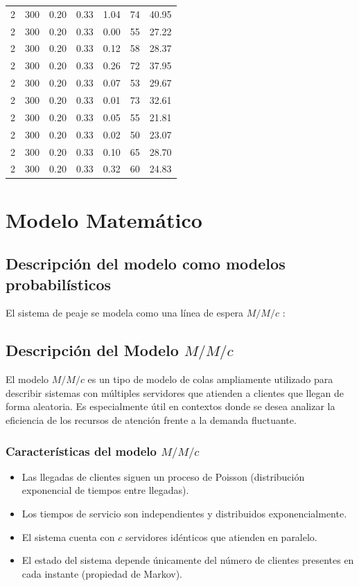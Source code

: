 \documentclass[12pt]{article}
\begin{document}
\begin{table}[H]
\begin{tabularx}{\textwidth}{|c|c|c|c|c|c|c|}
    2 & 300 & 0.20 & 0.33 & 1.04 & 74 & 40.95 \\
    2 & 300 & 0.20 & 0.33 & 0.00 & 55 & 27.22 \\
    2 & 300 & 0.20 & 0.33 & 0.12 & 58 & 28.37 \\
    2 & 300 & 0.20 & 0.33 & 0.26 & 72 & 37.95 \\
    2 & 300 & 0.20 & 0.33 & 0.07 & 53 & 29.67 \\
    2 & 300 & 0.20 & 0.33 & 0.01 & 73 & 32.61 \\
    2 & 300 & 0.20 & 0.33 & 0.05 & 55 & 21.81 \\
    2 & 300 & 0.20 & 0.33 & 0.02 & 50 & 23.07 \\
    2 & 300 & 0.20 & 0.33 & 0.10 & 65 & 28.70 \\
    2 & 300 & 0.20 & 0.33 & 0.32 & 60 & 24.83 \\
    \bottomrule
    \end{tabularx}
    
    \end{table}
    

    \newpage

    \section{Modelo Matemático}

    \subsection{Descripción del modelo como modelos probabilísticos}
    
    El sistema de peaje se modela como una línea de espera \( M/M/c \) :
    \subsection*{Descripción del Modelo $M/M/c$}

El modelo $M/M/c$ es un tipo de modelo de colas ampliamente utilizado para describir sistemas con múltiples servidores que atienden a clientes que llegan de forma aleatoria. Es especialmente útil en contextos donde se desea analizar la eficiencia de los recursos de atención frente a la demanda fluctuante.

\subsubsection*{Características del modelo $M/M/c$}
\begin{itemize}
    \item Las llegadas de clientes siguen un proceso de Poisson (distribución exponencial de tiempos entre llegadas).
    \item Los tiempos de servicio son independientes y distribuidos exponencialmente.
    \item El sistema cuenta con $c$ servidores idénticos que atienden en paralelo.
    \item El estado del sistema depende únicamente del número de clientes presentes en cada instante (propiedad de Markov).
\end{itemize}
\end{document}
